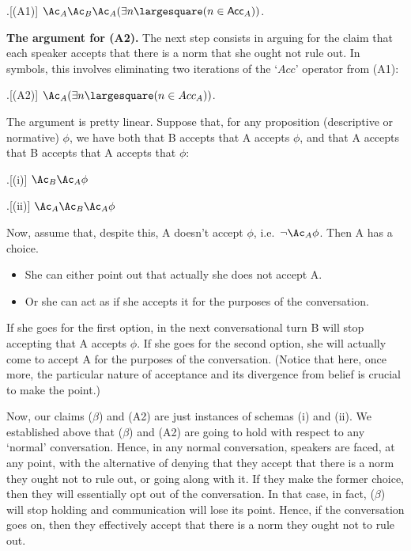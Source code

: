 \documentclass[11pt,article,oneside]{memoir}
\newcommand{\ought}{\largesquare}
\begin{document}
\ex.[(A1)] $\Ac_A \Ac_B \Ac_A (\exists n \ought (n \in \mathsf{Acc}_A))$.

\vspace{1\baselineskip}

\textbf{The argument for (A2).} The next step consists in arguing for the claim that each speaker accepts that there is a norm that she ought not rule out. In symbols, this involves eliminating two iterations of the `$Acc$' operator from (A1):

\ex.[(A2)] $\Ac_A (\exists n \ought (n \in {Acc}_A))$.

The argument is pretty linear. Suppose that, for any proposition (descriptive or normative) $\phi$, we have both that B accepts that A accepts $\phi$, and that A accepts that B accepts that A accepts that $\phi$:

\ex.[(i)] $\Ac_B \Ac_A \phi$ 


\ex.[(ii)] $\Ac_A \Ac_B \Ac_A \phi$

Now, assume that, despite this, A doesn't accept $\phi$, i.e.~$\neg \Ac_A \phi$. Then A has a choice. 
\begin{itemize}
\item She can either point out that actually she does not accept A. 
\item Or she can act as if she accepts it for the purposes of the conversation.
\end{itemize}
If she goes for the first option, in the next conversational turn B will stop accepting that A accepts $\phi$. If she goes for the second option, she will actually come to accept A for the purposes of the conversation. (Notice that here, once more, the particular nature of acceptance and its divergence from belief is crucial to make the point.)

Now, our claims ($\beta$) and (A2) are just instances of schemas (i) and (ii). We established above that ($\beta$) and (A2) are going to hold with respect to any `normal' conversation. Hence, in any normal conversation, speakers are faced, at any point, with the alternative of denying that they accept that there is a norm they ought not to rule out, or going along with it. If they make the former choice, then they will essentially opt out of the conversation. In that case, in fact, ($\beta$) will stop holding and communication will lose its point. Hence, if the conversation goes on, then they effectively accept that there is a norm they ought not to rule out.
\end{document}
